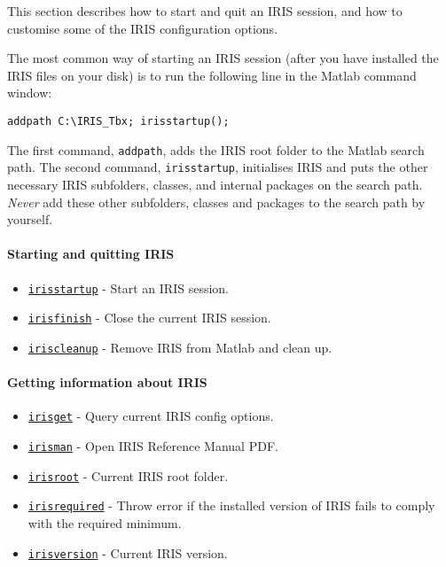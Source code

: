

	This section describes how to start and quit an IRIS session, and how to
customise some of the IRIS configuration options.

The most common way of starting an IRIS session (after you have
installed the IRIS files on your disk) is to run the following line in
the Matlab command window:

\begin{verbatim}
addpath C:\IRIS_Tbx; irisstartup();
\end{verbatim}

The first command, \texttt{addpath}, adds the IRIS root folder to the
Matlab search path. The second command, \texttt{irisstartup},
initialises IRIS and puts the other necessary IRIS subfolders, classes,
and internal packages on the search path. \emph{Never} add these other
subfolders, classes and packages to the search path by yourself.

\paragraph{Starting and quitting IRIS}\label{starting-and-quitting-iris}

\begin{itemize}
\itemsep1pt\parskip0pt
\item
  \href{config/irisstartup}{\texttt{irisstartup}} - Start an IRIS
  session.
\item
  \href{config/irisfinish}{\texttt{irisfinish}} - Close the current IRIS
  session.
\item
  \href{config/iriscleanup}{\texttt{iriscleanup}} - Remove IRIS from
  Matlab and clean up.
\end{itemize}

\paragraph{Getting information about
IRIS}\label{getting-information-about-iris}

\begin{itemize}
\itemsep1pt\parskip0pt
\item
  \href{config/irisget}{\texttt{irisget}} - Query current IRIS config
  options.
\item
  \href{config/irisman}{\texttt{irisman}} - Open IRIS Reference Manual
  PDF.
\item
  \href{config/irisroot}{\texttt{irisroot}} - Current IRIS root folder.
\item
  \href{config/irisrequired}{\texttt{irisrequired}} - Throw error if the
  installed version of IRIS fails to comply with the required minimum.
\item
  \href{config/irisversion}{\texttt{irisversion}} - Current IRIS
  version.
\end{itemize}

